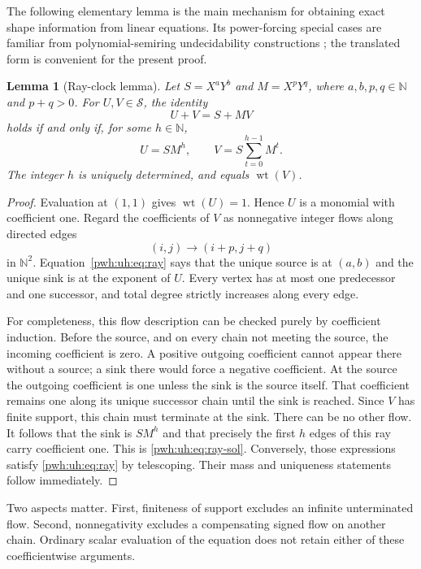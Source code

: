 \documentclass[11pt,letterpaper]{article}
\numberwithin{equation}{section}
\newtheorem{lemma}[theorem]{Lemma}
\theoremstyle{definition}
\newcommand{\N}{\mathbb N}
\newcommand{\wt}{\operatorname{wt}}
\newcommand{\Sring}{\mathcal S}
\begin{document}
The following elementary lemma is the main mechanism for obtaining exact
shape information from linear equations. Its power-forcing special cases
are familiar from polynomial-semiring undecidability constructions
\cite{uh:Narendran}; the translated form is convenient for the present proof.

\begin{lemma}[Ray-clock lemma]
\label{pwh:uh:lem:ray}
Let $S=X^aY^b$ and $M=X^pY^q$, where $a,b,p,q\in\N$ and $p+q>0$.
For $U,V\in\Sring$, the identity
\begin{equation}
 U+V=S+MV
 \label{pwh:uh:eq:ray}
\end{equation}
holds if and only if, for some $h\in\N$,
\begin{equation}
 U=SM^h,\qquad V=S\sum_{t=0}^{h-1}M^t.
 \label{pwh:uh:eq:ray-sol}
\end{equation}
The integer $h$ is uniquely determined, and equals $\wt(V)$.
\end{lemma}

\begin{proof}
Evaluation at $(1,1)$ gives $\wt(U)=1$. Hence $U$ is a monomial with
coefficient one. Regard the coefficients of $V$ as nonnegative integer
flows along directed edges
\[
 (i,j)\longrightarrow(i+p,j+q)
\]
in $\N^2$. Equation~\eqref{pwh:uh:eq:ray} says that the unique source is at
$(a,b)$ and the unique sink is at the exponent of $U$. Every vertex has at
most one predecessor and one successor, and total degree strictly
increases along every edge.

For completeness, this flow description can be checked purely by
coefficient induction. Before the source, and on every chain not meeting
the source, the incoming coefficient is zero. A positive outgoing
coefficient cannot appear there without a source; a sink there would
force a negative coefficient. At the source the outgoing coefficient is
one unless the sink is the source itself. That coefficient remains one
along its unique successor chain until the sink is reached. Since $V$
has finite support, this chain must terminate at the sink. There can be
no other flow. It follows that the sink is $SM^h$ and that precisely the
first $h$ edges of this ray carry coefficient one. This is
\eqref{pwh:uh:eq:ray-sol}. Conversely, those expressions satisfy
\eqref{pwh:uh:eq:ray} by telescoping. Their mass and uniqueness statements follow
immediately.
\end{proof}

Two aspects matter. First, finiteness of support excludes an infinite
unterminated flow. Second, nonnegativity excludes a compensating signed
flow on another chain. Ordinary scalar evaluation of the equation does
not retain either of these coefficientwise arguments.
\end{document}
